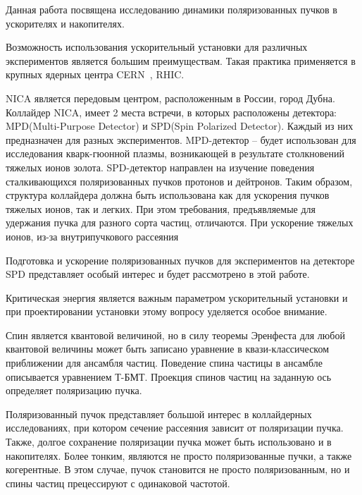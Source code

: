 \par Данная работа посвящена исследованию динамики поляризованных пучков в ускорителях и накопителях.

\par Возможность использования ускорительный установки для различных экспериментов является большим преимуществам. Такая практика применяется в крупных ядерных центра CERN~\autocite{Methodology}, RHIC.

\par NICA является передовым центром, расположенным в России, город Дубна. Коллайдер NICA, имеет 2 места встречи, в которых расположены детектора: MPD(Multi-Purpose Detector) и SPD(Spin Polarized Detector). Каждый из них предназначен для разных экспериментов. MPD-детектор – будет использован для исследования кварк-гюонной плазмы, возникающей в результате столкновений тяжелых ионов золота. SPD-детектор направлен на изучение поведения сталкивающихся поляризованных пучков протонов и дейтронов. Таким образом, структура коллайдера должна быть использована как для ускорения пучков тяжелых ионов, так и легких. При этом требования, предъявляемые для удержания пучка для разного сорта частиц, отличаются. При ускорение тяжелых ионов, из-за внутрипучкового рассеяния 

\par Подготовка и ускорение поляризованных пучков для экспериментов на детекторе SPD представляет особый интерес и будет рассмотрено в этой работе. 

\par Критическая энергия является важным параметром ускорительный установки и при проектировании установки этому вопросу уделяется особое внимание. 

\par Спин является квантовой величиной, но в силу теоремы Эренфеста для любой квантовой величины может быть записано уравнение в квази-классическом приближении для ансамбля частиц. Поведение спина частицы в ансамбле описывается уравнением Т-БМТ. 
Проекция спинов частиц на заданную ось определяет поляризацию пучка.

\par Поляризованный пучок представляет большой интерес в коллайдерных исследованиях, при котором сечение рассеяния зависит от поляризации пучка.
Также, долгое сохранение поляризации пучка может быть использовано и в накопителях. 
Более тонким, являются не просто поляризованные пучки, а также когерентные. В этом случае, пучок становится не просто поляризованным, но и спины частиц прецессируют с одинаковой частотой. 

